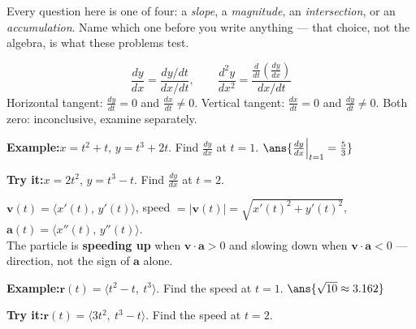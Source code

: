\documentclass[12pt]{article}
\begin{document}

\noindent\small Every question here is one of four: a \emph{slope}, a
\emph{magnitude}, an \emph{intersection}, or an \emph{accumulation}. Name which
one before you write anything --- that choice, not the algebra, is what these
problems test.\normalsize

\begin{formulabox}
\[ \frac{dy}{dx} = \frac{dy/dt}{dx/dt}, \qquad
   \frac{d^2y}{dx^2} = \frac{\frac{d}{dt}\!\left(\frac{dy}{dx}\right)}{dx/dt} \]
Horizontal tangent: $\frac{dy}{dt} = 0$ and $\frac{dx}{dt} \neq 0$.
Vertical tangent: $\frac{dx}{dt} = 0$ and $\frac{dy}{dt} \neq 0$. Both zero:
inconclusive, examine separately.
\end{formulabox}
\begin{examplebox}
\textbf{Example:}\quad $x = t^2+t$, $y = t^3+2t$. Find $\frac{dy}{dx}$ at $t=1$.
$\ans{\frac{dy}{dx}\Big|_{t=1} = \tfrac{5}{3}}$
\end{examplebox}
\begin{tryitbox}
\textbf{Try it:}\quad $x = 2t^2$, $y = t^3 - t$. Find $\frac{dy}{dx}$ at
$t = 2$.\\[2pt]
\end{tryitbox}

\begin{formulabox}
$\mathbf{v}(t) = \langle x'(t),\, y'(t)\rangle$, \quad
speed $= |\mathbf{v}(t)| = \sqrt{x'(t)^2 + y'(t)^2}$, \quad
$\mathbf{a}(t) = \langle x''(t),\, y''(t)\rangle$.\\[3pt]
The particle is \textbf{speeding up} when $\mathbf{v}\cdot\mathbf{a} > 0$ and
slowing down when $\mathbf{v}\cdot\mathbf{a} < 0$ --- direction, not the sign of
$\mathbf{a}$ alone.
\end{formulabox}
\begin{examplebox}
\textbf{Example:}\quad $\mathbf{r}(t) = \langle t^2 - t,\ t^3\rangle$. Find the
speed at $t=1$.
$\ans{\sqrt{10} \approx 3.162}$
\end{examplebox}
\begin{tryitbox}
\textbf{Try it:}\quad $\mathbf{r}(t) = \langle 3t^2,\ t^3 - t\rangle$. Find the
speed at $t = 2$.\\[2pt]
\end{tryitbox}
\end{document}

